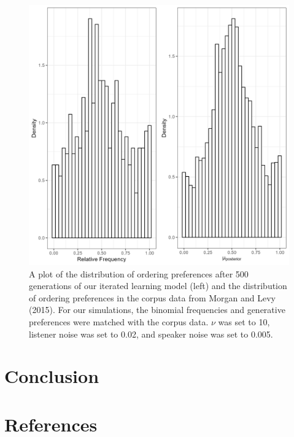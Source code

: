 \documentclass[
  jou,floatsintext]{apa6}
\begin{document}
\begin{figure}

{\centering \includegraphics[width=1\linewidth]{Figures/corpus_plot_and_ours} 

}

\caption{A plot of the distribution of ordering preferences after 500 generations of our iterated learning model (left) and the distribution of ordering preferences in the corpus data from Morgan and Levy (2015). For our simulations, the binomial frequencies and generative preferences were matched with the corpus data. \(\nu\) was set to 10, listener noise was set to 0.02, and speaker noise was set to 0.005.}\label{fig:corpusourmodel}
\end{figure}

\section{Conclusion}\label{conclusion}

\newpage

\section{References}\label{references}
\end{document}
